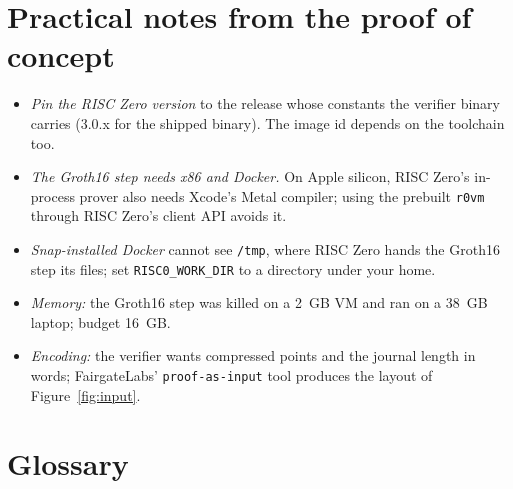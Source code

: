 \documentclass[11pt]{article}
\begin{document}
\section{Practical notes from the proof of concept}
\label{sec:practical}

\begin{itemize}[leftmargin=1.5em]
\item \emph{Pin the RISC Zero version} to the release whose constants
  the verifier binary carries (3.0.x for the shipped binary). The image
  id depends on the toolchain too.
\item \emph{The Groth16 step needs x86 and Docker.} On Apple silicon,
  RISC Zero's in-process prover also needs Xcode's Metal compiler; using
  the prebuilt \texttt{r0vm} through RISC Zero's client API avoids it.
\item \emph{Snap-installed Docker} cannot see \texttt{/tmp}, where RISC
  Zero hands the Groth16 step its files; set \texttt{RISC0\_WORK\_DIR}
  to a directory under your home.
\item \emph{Memory:} the Groth16 step was killed on a 2~GB VM and ran on
  a 38~GB laptop; budget 16~GB.
\item \emph{Encoding:} the verifier wants compressed points and the
  journal length in words; FairgateLabs' \texttt{proof-as-input} tool
  produces the layout of Figure~\ref{fig:input}.
\end{itemize}

\section*{Glossary}
\end{document}
